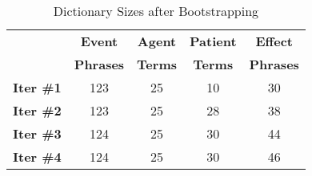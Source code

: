 \begin{table}[ht]
\small
\centering
\begin{tabular}[center]{|lcccc|} \hline
{\bf } & {\bf Event} & {\bf Agent} & {\bf Patient} & {\bf Effect}\\ 
{\bf } & {\bf Phrases} & {\bf Terms} & {\bf Terms} & {\bf Phrases}\\ \hline 
{\bf Iter \#1} & 123 & 25 & 10 & 30 \\
{\bf Iter \#2} & 123 & 25 & 28 & 38 \\
{\bf Iter \#3} & 124 & 25 & 30 & 44 \\ 
{\bf Iter \#4} & 124 & 25 & 30 & 46 \\ \hline
\end{tabular}
\caption{Dictionary Sizes after Bootstrapping}
\label{size-iter-terrorism}
\end{table}

